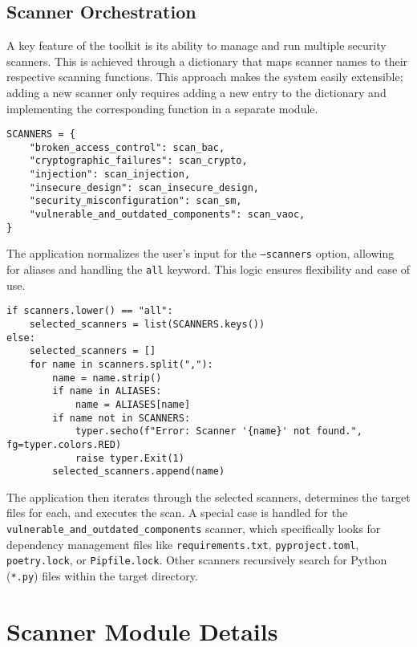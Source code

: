 \subsection{Scanner Orchestration}

A key feature of the toolkit is its ability to manage and run multiple security scanners. This is achieved through a dictionary that maps scanner names to their respective scanning functions. This approach makes the system easily extensible; adding a new scanner only requires adding a new entry to the dictionary and implementing the corresponding function in a separate module.

\begin{verbatim}
SCANNERS = {
    "broken_access_control": scan_bac,
    "cryptographic_failures": scan_crypto,
    "injection": scan_injection,
    "insecure_design": scan_insecure_design,
    "security_misconfiguration": scan_sm,
    "vulnerable_and_outdated_components": scan_vaoc,
}
\end{verbatim}

The application normalizes the user's input for the \texttt{--scanners} option, allowing for aliases and handling the \texttt{all} keyword. This logic ensures flexibility and ease of use.

\begin{verbatim}
if scanners.lower() == "all":
    selected_scanners = list(SCANNERS.keys())
else:
    selected_scanners = []
    for name in scanners.split(","):
        name = name.strip()
        if name in ALIASES:
            name = ALIASES[name]
        if name not in SCANNERS:
            typer.secho(f"Error: Scanner '{name}' not found.", fg=typer.colors.RED)
            raise typer.Exit(1)
        selected_scanners.append(name)
\end{verbatim}

The application then iterates through the selected scanners, determines the target files for each, and executes the scan. A special case is handled for the \texttt{vulnerable\_and\_outdated\_components} scanner, which specifically looks for dependency management files like \texttt{requirements.txt}, \texttt{pyproject.toml}, \texttt{poetry.lock}, or \texttt{Pipfile.lock}. Other scanners recursively search for Python (\texttt{*.py}) files within the target directory.

\section{Scanner Module Details}
\label{sec:scanner_modules}


